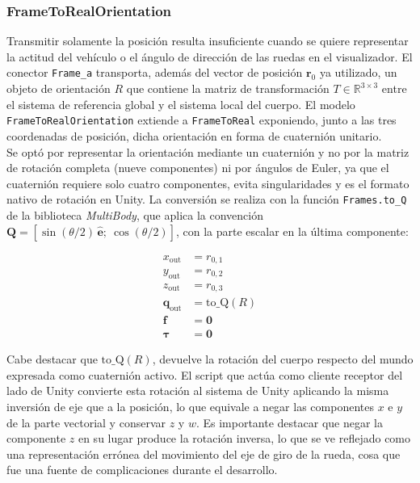 \subsubsection{FrameToRealOrientation}

Transmitir solamente la posición resulta insuficiente cuando se quiere representar la actitud del vehículo o el ángulo de dirección de las ruedas en el visualizador. El conector \verb|Frame_a| transporta, además del vector de posición $\mathbf{r}_0$ ya utilizado, un objeto de orientación $R$ que contiene la matriz de transformación $T \in \mathbb{R}^{3\times3}$ entre el sistema de referencia global y el sistema local del cuerpo. El modelo \verb|FrameToRealOrientation| extiende a \verb|FrameToReal| exponiendo, junto a las tres coordenadas de posición, dicha orientación en forma de cuaternión unitario.\\

Se optó por representar la orientación mediante un cuaternión y no por la matriz de rotación completa (nueve componentes) ni por ángulos de Euler, ya que el cuaternión requiere solo cuatro componentes, evita singularidades y es el formato nativo de rotación en Unity. La conversión se realiza con la función \verb|Frames.to_Q| de la biblioteca \textit{MultiBody}, que aplica la convención $\mathbf{Q} = [\sin(\theta/2)\,\hat{\mathbf{e}};\ \cos(\theta/2)]$, con la parte escalar en la última componente:

\begin{align}
    x_{\text{out}} &= r_{0,1} \\
    y_{\text{out}} &= r_{0,2} \\
    z_{\text{out}} &= r_{0,3} \\
    \mathbf{q}_{\text{out}} &= \text{to\_Q}(R) \\
    \mathbf{f} &= \mathbf{0} \\
    \boldsymbol{\tau} &= \mathbf{0}
\end{align}


Cabe destacar que $\text{to\_Q}(R)$, devuelve la rotación del cuerpo respecto del mundo expresada como cuaternión activo. El script que actúa como cliente receptor del lado de Unity convierte esta rotación al sistema de Unity aplicando la misma inversión de eje que a la posición, lo que equivale a negar las componentes $x$ e $y$ de la parte vectorial y conservar $z$ y $w$. Es importante destacar que negar la componente $z$ en su lugar produce la rotación inversa, lo que se ve reflejado como una representación errónea del movimiento del eje de giro de la rueda, cosa que fue una fuente de complicaciones durante el desarrollo.\\

